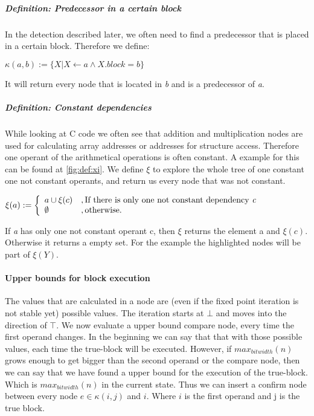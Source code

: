 \subparagraph{Definition: Predecessor in a certain block}
In the detection described later, we often need to find a predecessor that is placed in a certain block. Therefore we define:
\begin{center}
$\kappa(a, b) := \{X| X \leftarrow a \wedge X.block = b \}$ 
\end{center}

It will return every node that is located in \textit{b} and is a predecessor of \textit{a}.

\subparagraph{Definition: Constant dependencies}

While looking at C code we often see that addition and multiplication nodes are used for calculating array addresses or addresses for structure access. Therefore one operant of the arithmetical operations is often constant. A example for this can be found at \autoref{fig:def:xi}.
We define $\xi$ to explore the whole tree of one constant one not constant operants, and return us every node that was not constant.
\begin{center}
$\xi(a) := 
\left\{
	\begin{array}{l}
		a \cup \xi(c)\\ 
		\emptyset
	\end{array}
	\begin{array}{l}
		, \text{If there is only one not constant dependency \textit{c}} \\ 
		, \text{otherwise}.
	\end{array}
\right.$
\end{center}

If \textit{a} has only one not constant operant c, then $\xi$ returns the element a and $\xi(c)$. Otherwise it returns a empty set. For the example the highlighted nodes will be part of $\xi(Y)$.

\paragraph{Upper bounds for block execution}
The values that are calculated in a node are (even if the fixed point iteration is not stable yet) possible values. The iteration starts at $\bot$ and moves into the direction of $\top$. 
We now evaluate a upper bound compare node, every time the first operand changes. In the beginning we can say that that with those possible values, each time the true-block will be executed. However, if $max _{bitwidth}(n)$ grows enough to get bigger than the second operand or the compare node, then we can say that we have found a upper bound for the execution of the true-block. Which is $max _{bitwidth}(n)$ in the current state. Thus we can insert a confirm node between every node $e \in \kappa(i, j)$ and $i$. Where $i$ is the first operand and j is the true block.

